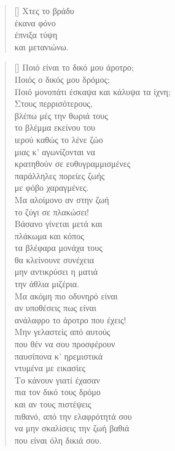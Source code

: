 \documentclass[12pt]{article}
\begin{document}
\newpage

\settowidth{\versewidth}{έκανα φόνο}
\begin{verse}[\versewidth]
  Χτες το βράδυ \\
  έκανα φόνο \\
  έπνιξα τύψη \\
  και μετανιώνω.
\end{verse}

\newpage

\settowidth{\versewidth}{Ποιό είναι το δικό μου άροτρο}
\begin{verse}[\versewidth]
  Ποιό είναι το δικό μου άροτρο; \\
  Ποιός ο δικός μου δρόμος; \\
  Ποιό μονοπάτι έσκαψα και κάλυψα τα ίχνη; \\
  Στους περρισότερους, \\
  βλέπω μές την θωριά τους \\
  το βλέμμα εκείνου του \\
  ιερού καθώς το λένε ζώο \\
  μιας κ' αγωνίζονται να \\
  κρατηθούν σε ευθυγραμμισμένες \\
  παράλληλες πορείες ζωής \\
  με φόβο χαραγμένες. \\
  Μα αλοίμονο αν στην ζωή \\
  το ζύγι σε πλακώσει! \\
  Βάσανο γίνεται μετά και \\
  πλάκωμα και κόπος \\
  τα βλέφαρα μονάχα τους \\
  θα κλείνουνε συνέχεια \\
  μην αντικρύσει η ματιά \\
  την άθλια μιζέρια. \\
  Μα ακόμη πιο οδυνηρό είναι \\
  αν υποθέσεις πως είναι \\
  ανάλαφρο το άροτρο που έχεις! \\
  Μην γελαστείς από  αυτούς \\
  που θέν να σου προσφέρουν \\
  παυσίπονα κ' ηρεμιστικά \\
  ντυμένα με εικασίες \\
  Το κάνουν γιατί έχασαν \\
  πια τον δικό τους δρόμο \\
  και αν τους πιστέψεις \\
  πιθανό, από την ελαφρότητά σου \\
  να μην σκαλίσεις την ζωή βαθιά \\
  που είναι όλη δικιά σου.
\end{verse}
\end{document}
